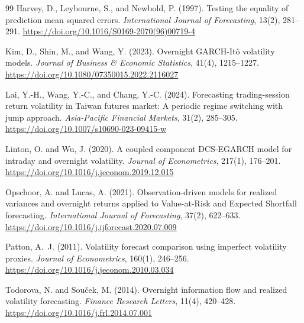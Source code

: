 \documentclass[11pt,a4paper]{article}
\begin{document}
\begin{thebibliography}{99}
Harvey, D., Leybourne, S., and Newbold, P. (1997).
\newblock Testing the equality of prediction mean squared errors.
\newblock \emph{International Journal of Forecasting}, 13(2), 281--291.
\newblock \url{https://doi.org/10.1016/S0169-2070(96)00719-4}

Kim, D., Shin, M., and Wang, Y. (2023).
\newblock Overnight GARCH-It\^{o} volatility models.
\newblock \emph{Journal of Business \& Economic Statistics}, 41(4), 1215--1227.
\newblock \url{https://doi.org/10.1080/07350015.2022.2116027}

Lai, Y.-H., Wang, Y.-C., and Chang, Y.-C. (2024).
\newblock Forecasting trading-session return volatility in Taiwan futures market:
A periodic regime switching with jump approach.
\newblock \emph{Asia-Pacific Financial Markets}, 31(2), 285--305.
\newblock \url{https://doi.org/10.1007/s10690-023-09415-w}

Linton, O. and Wu, J. (2020).
\newblock A coupled component DCS-EGARCH model for intraday and overnight volatility.
\newblock \emph{Journal of Econometrics}, 217(1), 176--201.
\newblock \url{https://doi.org/10.1016/j.jeconom.2019.12.015}

Opschoor, A. and Lucas, A. (2021).
\newblock Observation-driven models for realized variances and overnight returns applied to Value-at-Risk and Expected Shortfall forecasting.
\newblock \emph{International Journal of Forecasting}, 37(2), 622--633.
\newblock \url{https://doi.org/10.1016/j.ijforecast.2020.07.009}

Patton, A.~J. (2011).
\newblock Volatility forecast comparison using imperfect volatility proxies.
\newblock \emph{Journal of Econometrics}, 160(1), 246--256.
\newblock \url{https://doi.org/10.1016/j.jeconom.2010.03.034}

Todorova, N. and Sou\v{c}ek, M. (2014).
\newblock Overnight information flow and realized volatility forecasting.
\newblock \emph{Finance Research Letters}, 11(4), 420--428.
\newblock \url{https://doi.org/10.1016/j.frl.2014.07.001}

\end{thebibliography}
\end{document}

